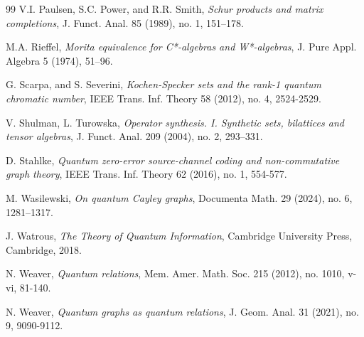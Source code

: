 \documentclass[11pt]{amsart}
\numberwithin{equation}{section}
\theoremstyle{plain}
\theoremstyle{definition}
\theoremstyle{remark}
\begin{document}
\begin{thebibliography}{99}
{\sc V.I. Paulsen, S.C. Power, and R.R. Smith},
{\it Schur products and matrix completions},
{\rm J. Funct. Anal. 85 (1989), no. 1, 151--178.}

{\sc M.A. Rieffel}, 
{\it Morita equivalence for C*-algebras and W*-algebras},
{\rm J. Pure Appl. Algebra 5 (1974), 51--96.}

{\sc G. Scarpa, and S. Severini},
{\it Kochen-Specker sets and the rank-1 quantum chromatic number},
{\rm IEEE Trans. Inf. Theory 58 (2012), no. 4, 2524-2529.}

{\sc V. Shulman, L. Turowska}, 
{\it Operator synthesis. I. Synthetic sets, bilattices and tensor algebras},
{\rm J. Funct. Anal. 209 (2004), no. 2, 293--331.}

{\sc D. Stahlke},
{\it Quantum zero-error source-channel coding and non-commutative graph theory},
{\rm IEEE Trans. Inf. Theory 62 (2016), no. 1, 554-577}.

{\sc M. Wasilewski}, 
{\it On quantum Cayley graphs}, 
{\rm Documenta Math. 29 (2024), no. 6, 1281--1317.}

{\sc J. Watrous},
{\it The Theory of Quantum Information},
{\rm Cambridge University Press, Cambridge, 2018}.

{\sc N. Weaver},
{\it Quantum relations},
{\rm Mem. Amer. Math. Soc. 215 (2012), no. 1010, v-vi, 81-140.}

{\sc N. Weaver},
{\it Quantum graphs as quantum relations},
{\rm J. Geom. Anal. 31 (2021), no. 9, 9090-9112.}

\end{thebibliography}
\end{document}
